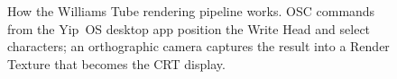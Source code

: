 \begin{figure}[H]
\begin{tikzpicture}
\end{tikzpicture}
\caption{How the Williams Tube rendering pipeline works. OSC commands from the
Yip~OS desktop app position the Write Head and select characters;
an orthographic camera captures the result into a
Render Texture that becomes the CRT display.}
\label{fig:williams-tube}
\end{figure}
